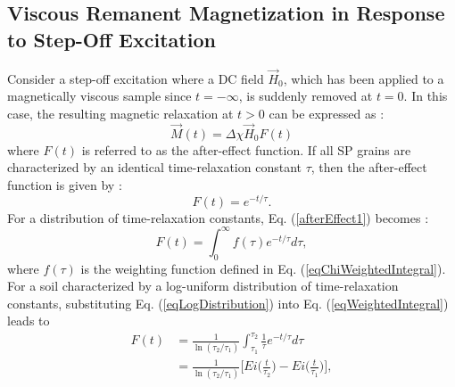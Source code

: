 \documentclass[journal]{IEEEtran}  %
\begin{document}

\subsection{Viscous Remanent Magnetization in Response to Step-Off Excitation}

Consider a step-off excitation where a DC field $\vec H_0$, which
has been applied to a magnetically viscous sample since $t =
-\infty$, is suddenly removed at $t=0$. In this case, the resulting
magnetic relaxation at $t >0$ can be expressed as
\cite{Neel1949,Billings2003,Pasion2007}:
\begin{equation}
\vec M(t) = \Delta \chi \vec H_0 F(t)
\label{eqMagSte}
\end{equation}
where $F(t)$ is referred to as the after-effect function. If all SP
grains are characterized by an identical time-relaxation constant
$\tau$, then the after-effect function is given by
\cite{Neel1949,Billings2003,Pasion2007}:
\begin{equation}
F (t) = e^{-t/\tau}. \label{afterEffect1}
\end{equation}
For a distribution of time-relaxation constants, Eq.
(\ref{afterEffect1}) becomes
\cite{Neel1949,Mullins1973,Billings2003,Pasion2007}:
\begin{equation}
\label{eqWeightedIntegral} F(t) = \int^{\infty}_0 f(\tau)
e^{-t/\tau} d \tau,
\end{equation}
where $f(\tau)$ is the weighting function defined in Eq.
(\ref{eqChiWeightedIntegral}). For a soil characterized by a
log-uniform distribution of time-relaxation constants, substituting
Eq. (\ref{eqLogDistribution}) into Eq. (\ref{eqWeightedIntegral})
leads to
\begin{equation}
\begin{split}
F(t) &= \frac{1}{\ln(\tau_2/\tau_1)} \int^{\tau_2}_{\tau_1} \frac{1}{\tau} e^{-t/\tau} d \tau \\
 & = \frac{1}{\ln(\tau_2/\tau_1)} \Bigg [ Ei \Big
( \frac{t}{\tau_2} \Big ) - Ei \Big ( \frac{t}{\tau_1} \Big ) \Bigg
],
\end{split}
\label{eqIntDist}
\end{equation}
\end{document}
